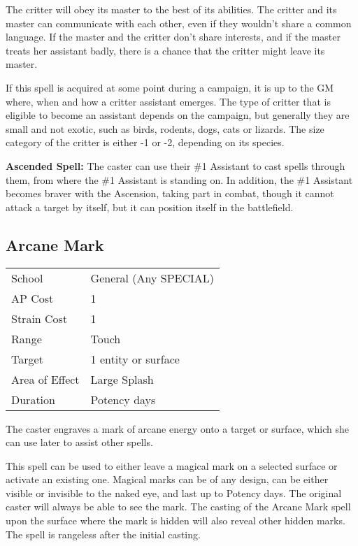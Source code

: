 \documentclass[11pt,a4paper,twocolumn]{book}
\begin{document}
The critter will obey its master to the best of its abilities. The critter and its master can communicate with each other, even if they wouldn't share a common language. If the master and the critter don't share interests, and if the master treats her assistant badly, there is a chance that the critter might leave its master.

If this spell is acquired at some point during a campaign, it is up to the GM where, when and how a critter assistant emerges. The type of critter that is eligible to become an assistant depends on the campaign, but generally they are small and not exotic, such as birds, rodents, dogs, cats or lizards. The size category of the critter is either -1 or -2, depending on its species.

\bigskip

\textbf{Ascended Spell:} The caster can use their \#1 Assistant to cast spells through them, from where the \#1 Assistant is standing on. In addition, the \#1 Assistant becomes braver with the Ascension, taking part in combat, though it cannot attack a target by itself, but it can position itself in the battlefield.


\subsection*{Arcane Mark}
{
	\begin{tabu} to 75mm{| X[l,4] | X[l,7] |}
		\hline
		School 			& General (Any SPECIAL) \\
		AP Cost	      	& 1 					\\
		Strain Cost     & 1 					\\
		Range     		& Touch 				\\
		Target      	& 1 entity or surface 	\\
		Area of Effect  & Large Splash 	 		\\
		Duration     	& Potency days 			\\ \hline
	\end{tabu}
	
}

\medskip

The caster engraves a mark of arcane energy onto a target or surface, which she can use later to assist other spells.

This spell can be used to either leave a magical mark on a selected surface or activate an existing one. Magical marks can be of any design, can be either visible or invisible to the naked eye, and last up to Potency days. The original caster will always be able to see the mark. The casting of the Arcane Mark spell upon the surface where the mark is hidden will also reveal other hidden marks. The spell is rangeless after the initial casting.
\end{document}
